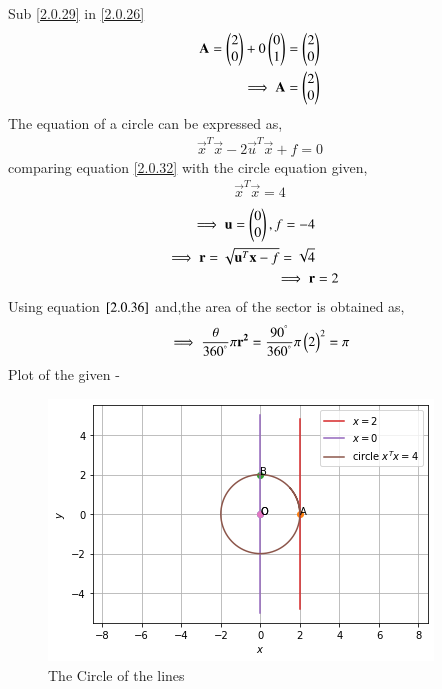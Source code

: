 \documentclass[journal,12pt,twocolumn]{IEEEtran}
\begin{document}
Sub \eqref{2.0.29} in \eqref{2.0.26}
\begin{align}
 \mathbf{A}=\begin{pmatrix}2 \\0\end{pmatrix}+0\begin{pmatrix}0\\1\end{pmatrix}=\begin{pmatrix}2\\0\end{pmatrix}
 \\
 \implies \mathbf{A}=\begin{pmatrix}2 \\ 0\end{pmatrix}
\end{align}
The equation of a circle can be expressed as,
\begin{align}
\vec{x}^T\vec{x} - 2\vec{u}^T\vec{x} + f= 0\label{2.0.32}
\end{align}
comparing equation \eqref{2.0.32} with the circle equation given,
\begin{align}
\vec{x}^T\vec{x} = 4
\end{align}
\begin{align}
\implies \mathbf{u}=\begin{pmatrix}0\\0\end{pmatrix},f = -4
\\
\implies \mathbf{r}=\sqrt{\mathbf{u}^T\mathbf{x}-{f}}=\sqrt{{4}}
\\
\implies \mathbf{r} &=2 \label{2.0.36}
\end{align}
Using equation $\eqref{2.0.36}$ and,the area of the sector is obtained as,
\begin{align}
 \implies  \frac{\theta}{360^{\degree}}\pi\mathbf{r^2}=\frac{90^{\degree}}{360^{\degree}}\pi\begin{pmatrix}2\end{pmatrix}^2=\pi
\end{align}
Plot of the given -
\begin{figure}[!ht]
\centering
\includegraphics[width=\columnwidth]{Figure 5.png}
\caption{The Circle of the lines }
\label{fig:The circle of the lines}	\end{figure}
\end{document}
